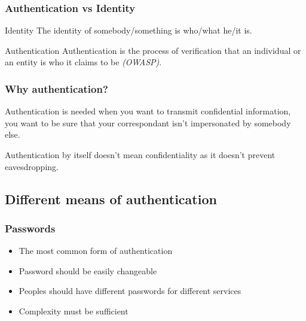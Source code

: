 \begin{frame}
\frametitle{Authentication vs Identity}
\begin{block}{Identity} 
The identity of somebody/something is who/what he/it is.
\end{block}
\begin{block}{Authentication} Authentication is the process of
  verification that an individual or an entity is who it claims to
  be \textit{(OWASP)}. 
\end{block}
\end{frame}


\begin{frame}
\frametitle{Why authentication?}

Authentication is needed when you want to transmit confidential
information, you want to be sure that your correspondant isn't
impersonated by somebody else.

Authentication by itself doesn't mean confidentiality as it doesn't
prevent eavesdropping.

\end{frame}


\subsection{Different means of authentication}

\begin{frame}
\frametitle{Passwords}

\begin{itemize}
\item The most common form of authentication
\item Password should be easily changeable
\item Peoples should have different passwords for different services
\item Complexity must be sufficient
\end{itemize}
\end{frame}




